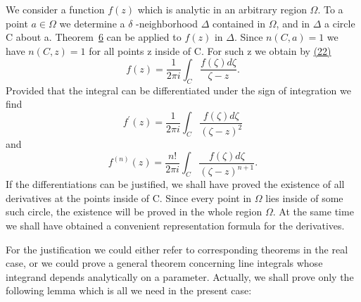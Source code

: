 We consider a function $f(z)$ which is analytic in an arbitrary region $\Omega$. To a point $a \in \Omega$ we determine a $\delta$ -neighborhood $\Delta$ contained in $\Omega$, and in $\Delta$ a circle C about a. Theorem~\hyperref[thm:4.6]{6} can be applied to $f(z)$ in $\Delta$. Since $n(C, a) = 1$ we have $n(C, z) = 1$ for all points z inside of C. For such z we obtain by \hyperref[eq:4.22]{(22)}
\begin{equation*}
f (z) = \frac {1}{2 \pi i} \int_ {C} \frac {f (\zeta) d \zeta}{\zeta - z}.
\end{equation*}
Provided that the integral can be differentiated under the sign of integration we find
\begin{equation*}
f ^ {\prime} (z) = \frac {1}{2 \pi i} \int_ {C} \frac {f (\zeta) d \zeta}{(\zeta - z) ^ {2}}\tag{23}\label{eq:4.23}
\end{equation*}
and
\begin{equation*}
f ^ {(n)} (z) = \frac {n !}{2 \pi i} \int_ {C} \frac {f (\zeta) d \zeta}{(\zeta - z) ^ {n + 1}}.\tag{24}\label{eq:4.24}
\end{equation*}
If the differentiations can be justified, we shall have proved the existence of all derivatives at the points inside of C. Since every point in $\Omega$ lies inside of some such circle, the existence will be proved in the whole region $\Omega$. At the same time we shall have obtained a convenient representation formula for the derivatives.

For the justification we could either refer to corresponding theorems in the real case, or we could prove a general theorem concerning line integrals whose integrand depends analytically on a parameter. Actually, we shall prove only the following lemma which is all we need in the present case:

